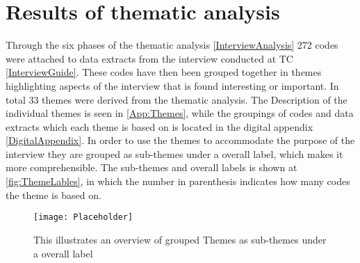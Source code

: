 \chapter{Results of thematic analysis}
\label{ThemanticAnalysis}


\noindent
Through the six phases of the thematic analysis \autoref{InterviewAnalysis} 272 codes were attached to data extracts from the interview conducted at TC \autoref{InterviewGuide}. These codes have then been grouped together in themes highlighting aspects of the interview that is found interesting or important. In total 33 themes were derived from the thematic analysis. The Description of the individual themes is seen in \autoref{App:Themes}, while the groupings of codes and data extracts which each theme is based on is located in the digital appendix \autoref{DigitalAppendix}. In order to use the themes to accommodate the purpose of the interview they are grouped as sub-themes under a overall label, which makes it more comprehensible. The sub-themes and overall labels is shown at \autoref{fig:ThemeLables}, in which the number in parenthesis indicates how many codes the theme is based on. 

\begin{figure}[H]
	\centering
	\texttt{[image: Placeholder]}
	\caption{This illustrates an overview of grouped Themes as sub-themes under a overall label}
	\label{fig:ThemeLables}
\end{figure}

